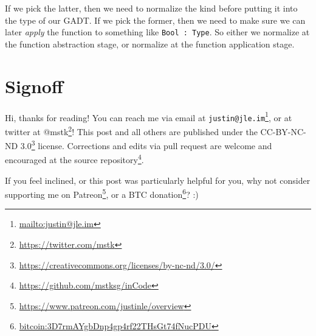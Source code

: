 \documentclass[]{article}
\renewcommand{\href}[2]{#2\footnote{\url{#1}}}
\begin{document}
If we pick the latter, then we need to normalize the kind before putting it into
the type of our GADT. If we pick the former, then we need to make sure we can
later \emph{apply} the function to something like \texttt{Bool\ :\ Type}. So
either we normalize at the function abstraction stage, or normalize at the
function application stage.

\hypertarget{signoff}{%
\section{Signoff}\label{signoff}}

Hi, thanks for reading! You can reach me via email at
\href{mailto:justin@jle.im}{\nolinkurl{justin@jle.im}}, or at twitter at
\href{https://twitter.com/mstk}{@mstk}! This post and all others are published
under the \href{https://creativecommons.org/licenses/by-nc-nd/3.0/}{CC-BY-NC-ND
3.0} license. Corrections and edits via pull request are welcome and encouraged
at \href{https://github.com/mstksg/inCode}{the source repository}.

If you feel inclined, or this post was particularly helpful for you, why not
consider \href{https://www.patreon.com/justinle/overview}{supporting me on
Patreon}, or a \href{bitcoin:3D7rmAYgbDnp4gp4rf22THsGt74fNucPDU}{BTC donation}?
:)
\end{document}
